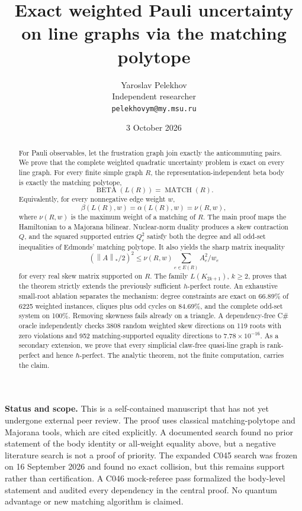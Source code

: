 \documentclass[11pt,a4paper]{article}
\title{Exact weighted Pauli uncertainty on line graphs via the matching polytope}
\author{Yaroslav Pelekhov\\Independent researcher\\\texttt{pelekhovym@my.msu.ru}}
\date{3 October 2026}
\theoremstyle{remark}
\newcommand{\norm}[1]{\left\lVert#1\right\rVert}
\newcommand{\MATCH}{\operatorname{MATCH}}
\newcommand{\BETA}{\operatorname{BETA}}
\begin{document}
\maketitle

\begin{abstract}
For Pauli observables, let the frustration graph join exactly the
anticommuting pairs. We prove that the complete weighted quadratic uncertainty
problem is exact on every line graph. For every finite simple graph $R$, the
representation-independent beta body is exactly the matching polytope,
\[
 \BETA(L(R))=\MATCH(R).
\]
Equivalently, for every nonnegative edge weight $w$,
\[
 \beta(L(R),w)=\alpha(L(R),w)=\nu(R,w),
\]
where $\nu(R,w)$ is the maximum weight of a matching of $R$. The main proof
maps the Hamiltonian to a Majorana bilinear. Nuclear-norm duality produces
a skew contraction $Q$, and the squared supported entries $Q_e^2$ satisfy
both the degree and all odd-set inequalities of Edmonds' matching polytope.
It also yields the sharp matrix inequality
\[
 \left(\norm{A}_*/2\right)^2\leq
 \nu(R,w)\sum_{e\in E(R)}A_e^2/w_e
\]
for every real skew matrix supported on $R$. The family $L(K_{2k+1})$,
$k\geq2$, proves that the theorem strictly extends the previously sufficient
$h$-perfect route. An exhaustive small-root ablation separates the mechanism:
degree constraints are exact on 66.89\% of 6225 weighted instances, cliques
plus odd cycles on 84.69\%, and the complete odd-set system on 100\%. Removing
skewness fails already on a triangle. A dependency-free C\# oracle independently
checks 3808 random weighted skew directions on 119 roots with zero violations
and 952 matching-supported equality directions to $7.78\times10^{-16}$. As a
secondary extension, we prove that
every simplicial claw-free quasi-line graph is rank-perfect and hence
$\hbar$-perfect. The analytic theorem, not the finite computation, carries the
claim.
\end{abstract}

\noindent\textbf{Status and scope.}
This is a self-contained manuscript that has not yet undergone external peer
review. The proof uses classical matching-polytope and Majorana tools, which
are cited explicitly. A documented search found no prior statement of the
body identity or all-weight equality above, but a negative literature search
is not a proof of priority. The expanded C045 search was frozen on 16 September
2026 and found no exact collision, but this remains support rather than
certification. A C046 mock-referee pass formalized the body-level statement and
audited every dependency in the central proof.
No quantum advantage or new matching algorithm is claimed.
\end{document}
